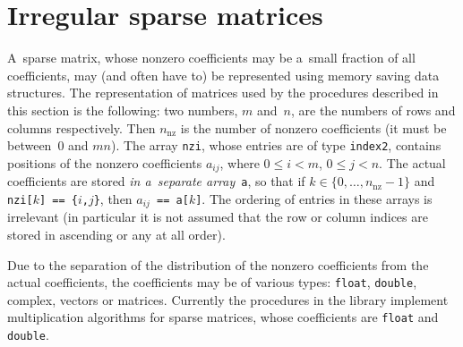 \vspace{\bigskipamount}

\vspace{\bigskipamount}

\vspace{\bigskipamount}


\newpage
\section{\label{sect:sparse:matrices}Irregular sparse matrices}

A~sparse matrix, whose nonzero coefficients may be a~small fraction of all
coefficients, may (and often have to) be represented using memory saving
data structures. The representation of matrices used by the procedures
described in this section is the following: two numbers, $m$ and~$n$, are
the numbers of rows and columns respectively. Then $n_{\mathrm{nz}}$ is the
number of nonzero coefficients (it must be between~$0$ and $mn$). The array
\texttt{nzi}, whose entries are of type \texttt{index2}, contains positions
of the nonzero coefficients $a_{ij}$, where $0\leq i<m$, $0\leq j<n$.
The actual coefficients are stored \emph{in a~separate array}~\texttt{a}, so that
if $k\in\{0,\ldots,n_{\mathrm{nz}}-1\}$ and \texttt{nzi[$k$] == \{$i$,$j$\}},
then $a_{ij}$\texttt{ == a[$k$]}. The ordering of entries in these arrays is
irrelevant (in particular it is not assumed that the row or column indices
are stored in ascending or any at all order).

Due to the separation of the distribution of the nonzero coefficients from
the actual coefficients, the coefficients may be of various types:
\texttt{float}, \texttt{double}, complex, vectors or matrices. Currently the
procedures in the library implement multiplication algorithms for sparse
matrices, whose coefficients are \texttt{float} and \texttt{double}.

